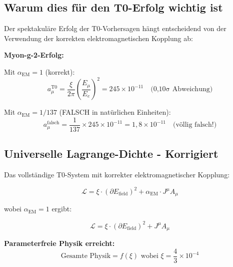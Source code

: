 \documentclass[12pt,a4paper]{report}
\begin{document}
	\subsection{Warum dies für den T0-Erfolg wichtig ist}
	\label{subsec:why_this_matters}
	
	Der spektakuläre Erfolg der T0-Vorhersagen hängt entscheidend von der Verwendung der korrekten elektromagnetischen Kopplung ab:
	
	\begin{tcolorbox}[colback=green!10!white,colframe=green!75!black,title=T0-ERFOLG ERKLÄRT]
		\textbf{Myon-g-2-Erfolg:}
		
		Mit $\alpha_{\text{EM}} = 1$ (korrekt):
		\begin{equation}
			a_\mu^{\text{T0}} = \frac{\xi}{2\pi} \left(\frac{E_\mu}{E_e}\right)^2 = 245 \times 10^{-11} \quad \text{(0,10σ Abweichung)}
		\end{equation}
		
		Mit $\alpha_{\text{EM}} = 1/137$ (FALSCH in natürlichen Einheiten):
		\begin{equation}
			a_\mu^{\text{falsch}} = \frac{1}{137} \times 245 \times 10^{-11} = 1,8 \times 10^{-11} \quad \text{(völlig falsch!)}
		\end{equation}
	\end{tcolorbox}
	
	\subsection{Universelle Lagrange-Dichte - Korrigiert}
	\label{subsec:universal_lagrangian_corrected}
	
	Das vollständige T0-System mit korrekter elektromagnetischer Kopplung:
	
	\begin{equation}
		\boxed{\mathcal{L} = \xi \cdot (\partial E_{\text{field}})^2 + \alpha_{\text{EM}} \cdot J^\mu A_\mu}
	\end{equation}
	
	wobei $\alpha_{\text{EM}} = 1$ ergibt:
	
	\begin{equation}
		\mathcal{L} = \xi \cdot (\partial E_{\text{field}})^2 + J^\mu A_\mu
	\end{equation}
	
	\textbf{Parameterfreie Physik erreicht:}
	\begin{equation}
		\boxed{\text{Gesamte Physik} = f(\xi) \text{ wobei } \xi = \frac{4}{3} \times 10^{-4}}
	\end{equation}
	
\end{document}
